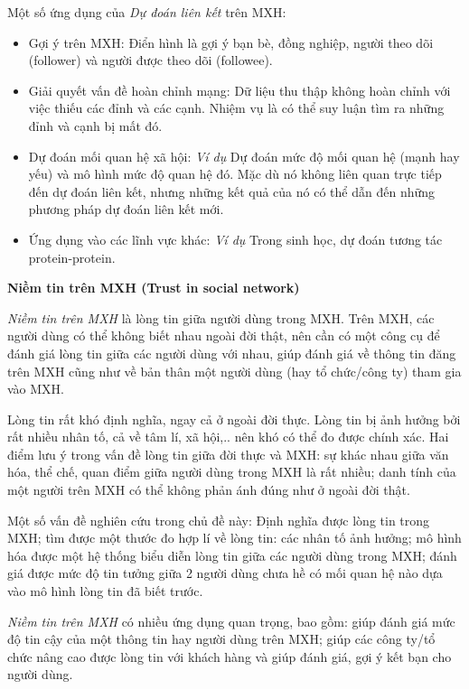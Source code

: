 \documentclass[12pt]{extarticle}
\begin{document}
			\par Một số ứng dụng của \textit{Dự đoán liên kết} trên MXH:
			\begin{itemize}
				\item Gợi ý trên MXH: Điển hình là gợi ý bạn bè, đồng nghiệp, người theo dõi (follower) và người được theo dõi (followee).
				\item Giải quyết vấn đề hoàn chỉnh mạng: Dữ liệu thu thập không hoàn chỉnh với việc thiếu các đỉnh và các cạnh. Nhiệm vụ là có thể suy luận tìm ra những đỉnh và cạnh bị mất đó.
				\item Dự đoán mối quan hệ xã hội: \textit{Ví dụ} Dự đoán mức độ mối quan hệ (mạnh hay yếu) và mô hình mức độ quan hệ đó. Mặc dù nó không liên quan trực tiếp đến dự đoán liên kết, nhưng những kết quả của nó có thể dẫn đến những phương pháp dự đoán liên kết mới.
				\item Ứng dụng vào các lĩnh vực khác: \textit{Ví dụ} Trong sinh học, dự đoán tương tác protein-protein. 
			\end{itemize}
			\par \textbf{Niềm tin trên MXH (Trust in social network)}
			\par \textit{Niềm tin trên MXH} là lòng tin giữa người dùng trong MXH. Trên MXH, các người dùng có thể không biết nhau ngoài đời thật, nên cần có một công cụ để đánh giá lòng tin giữa các người dùng với nhau, giúp đánh giá về thông tin đăng trên MXH cũng như về bản thân một người dùng (hay tổ chức/công ty) tham gia vào MXH.
			\par Lòng tin rất khó định nghĩa, ngay cả ở ngoài đời thực. Lòng tin bị ảnh hưởng bởi rất nhiều nhân tố, cả về tâm lí, xã hội,.. nên khó có thể đo được chính xác. Hai điểm lưu ý trong vấn đề lòng tin giữa đời thực và MXH: sự khác nhau giữa văn hóa, thể chế, quan điểm giữa người dùng trong MXH là rất nhiều; danh tính của một người trên MXH có thể không phản ánh đúng như ở ngoài đời thật.
			\par Một số vấn đề nghiên cứu trong chủ đề này: Định nghĩa được lòng tin trong MXH; tìm được một thước đo hợp lí về lòng tin: các nhân tố ảnh hưởng; mô hình hóa được một hệ thống biểu diễn lòng tin giữa các người dùng trong MXH; đánh giá được mức độ tin tưởng giữa 2 người dùng chưa hề có mối quan hệ nào dựa vào mô hình lòng tin đã biết trước.
			\par \textit{Niềm tin trên MXH} có nhiều ứng dụng quan trọng, bao gồm: giúp đánh giá mức độ tin cậy của một thông tin hay người dùng trên MXH; giúp các công ty/tổ chức nâng cao được lòng tin với khách hàng và giúp đánh giá, gợi ý kết bạn cho người dùng.
\end{document}
